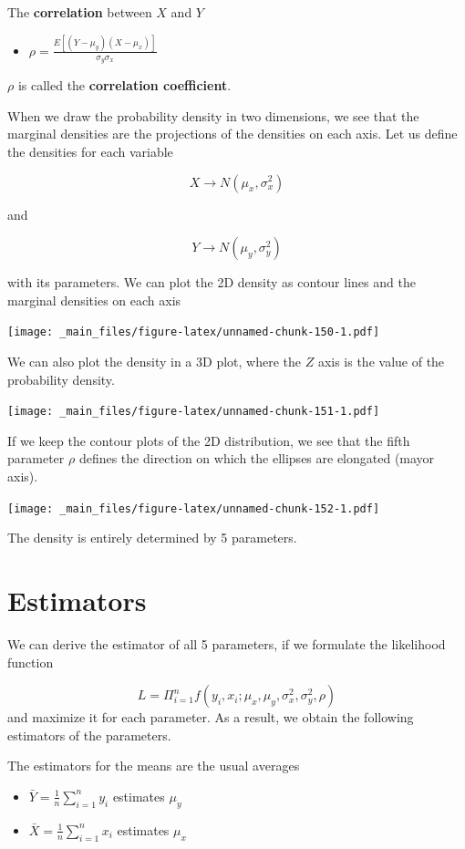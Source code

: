 \documentclass[
]{book}
\providecommand{\tightlist}{%
  \setlength{\itemsep}{0pt}\setlength{\parskip}{0pt}}
\begin{document}
The \textbf{correlation} between \(X\) and \(Y\)

\begin{itemize}
\tightlist
\item
  \(\rho=\frac{E[(Y-\mu_y)(X-\mu_x)]}{\sigma_y\sigma_x}\)
\end{itemize}

\(\rho\) is called the \textbf{correlation coefficient}.

When we draw the probability density in two dimensions, we see that the marginal densities are the projections of the densities on each axis. Let us define the densities for each variable

\[X \rightarrow N(\mu_x, \sigma_x^2)\]

and

\[Y \rightarrow N(\mu_y, \sigma_y^2)\]

with its parameters. We can plot the 2D density as contour lines and the marginal densities on each axis

\texttt{[image: \_main\_files/figure-latex/unnamed-chunk-150-1.pdf]}

We can also plot the density in a 3D plot, where the \(Z\) axis is the value of the probability density.

\texttt{[image: \_main\_files/figure-latex/unnamed-chunk-151-1.pdf]}

If we keep the contour plots of the 2D distribution, we see that the fifth parameter \(\rho\) defines the direction on which the ellipses are elongated (mayor axis).

\texttt{[image: \_main\_files/figure-latex/unnamed-chunk-152-1.pdf]}

The density is entirely determined by 5 parameters.

\hypertarget{estimators}{%
\section{Estimators}\label{estimators}}

We can derive the estimator of all 5 parameters, if we formulate the likelihood function

\[L=\Pi_{i=1}^n f(y_i,x_i; \mu_x, \mu_y, \sigma^2_x, \sigma_y^2, \rho)\]
and maximize it for each parameter. As a result, we obtain the following estimators of the parameters.

The estimators for the means are the usual averages

\begin{itemize}
\tightlist
\item
  \(\bar{Y}=\frac{1}{n}\sum_{i=1}^n y_i\) estimates \(\mu_y\)
\item
  \(\bar{X}=\frac{1}{n}\sum_{i=1}^n x_i\) estimates \(\mu_x\)
\end{itemize}
\end{document}
